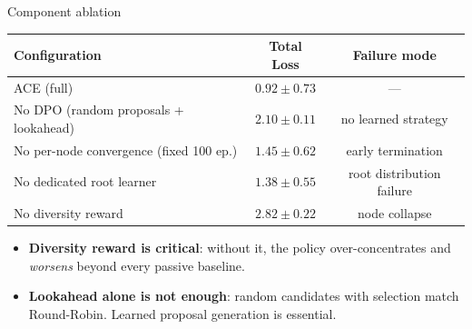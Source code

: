 \documentclass[aspectratio=169,10pt]{beamer}
\begin{document}
\begin{frame}{Component ablation}
\centering
\small
\begin{tabular}{@{}lcc@{}}
\toprule
Configuration & Total Loss & Failure mode \\
\midrule
ACE (full)                        & $0.92\pm0.73$  & --- \\
\midrule
No DPO (random proposals + lookahead) & $2.10\pm0.11$ & no learned strategy \\
No per-node convergence (fixed 100 ep.)& $1.45\pm0.62$ & early termination \\
No dedicated root learner             & $1.38\pm0.55$ & root distribution failure \\
No diversity reward                   & $2.82\pm0.22$ & node collapse \\
\bottomrule
\end{tabular}
\vspace{0.5em}
\begin{itemize}
\item \textbf{Diversity reward is critical}: without it, the policy over-concentrates and
      \emph{worsens} beyond every passive baseline.
\item \textbf{Lookahead alone is not enough}: random candidates with selection match Round-Robin.
      Learned proposal generation is essential.
\end{itemize}
\end{frame}
\end{document}
